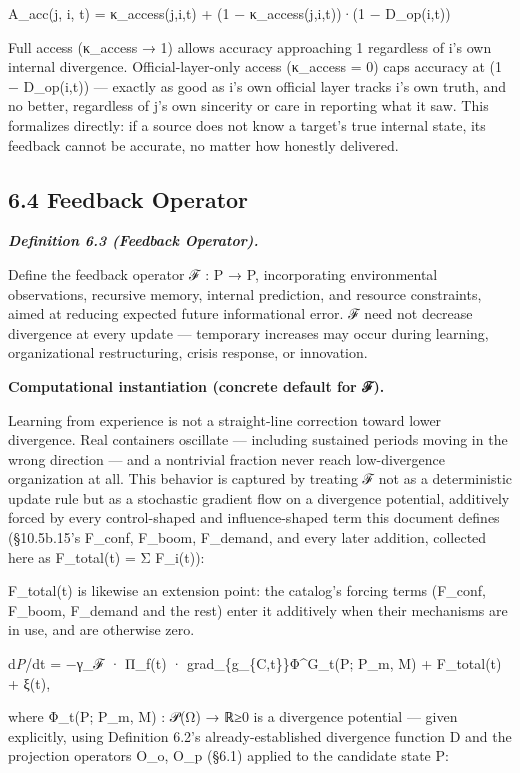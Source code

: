 \documentclass[
]{article}
\begin{document}
A\_acc(j, i, t) = κ\_access(j,i,t) + (1 − κ\_access(j,i,t))·(1 −
D\_op(i,t))

Full access (κ\_access → 1) allows accuracy approaching 1 regardless of
i's own internal divergence. Official-layer-only access (κ\_access = 0)
caps accuracy at (1 − D\_op(i,t)) --- exactly as good as i's own
official layer tracks i's own truth, and no better, regardless of j's
own sincerity or care in reporting what it saw. This formalizes
directly: if a source does not know a target's true internal state, its
feedback cannot be accurate, no matter how honestly delivered.

\hypertarget{feedback-operator}{%
\subsection{6.4 Feedback Operator}\label{feedback-operator}}

\emph{\textbf{Definition 6.3 (Feedback Operator).}}

Define the feedback operator ℱ : P → P, incorporating environmental
observations, recursive memory, internal prediction, and resource
constraints, aimed at reducing expected future informational error. ℱ
need not decrease divergence at every update --- temporary increases may
occur during learning, organizational restructuring, crisis response, or
innovation.

\textbf{Computational instantiation (concrete default for ℱ).}

Learning from experience is not a straight-line correction toward lower
divergence. Real containers oscillate --- including sustained periods
moving in the wrong direction --- and a nontrivial fraction never reach
low-divergence organization at all. This behavior is captured by
treating ℱ not as a deterministic update rule but as a stochastic
gradient flow on a divergence potential, additively forced by every
control-shaped and influence-shaped term this document defines
(§10.5b.15's F\_conf, F\_boom, F\_demand, and every later addition,
collected here as F\_total(t) = Σ F\_i(t)):

F\_total(t) is likewise an extension point: the catalog's forcing terms
(F\_conf, F\_boom, F\_demand and the rest) enter it additively when
their mechanisms are in use, and are otherwise zero.

d\emph{P}/dt = −γ\_ℱ · Π\_f(t) · grad\_\{g\_\{C,t\}\}Φ\^{}G\_t(P; P\_m,
M) + F\_total(t) + ξ(t),

where Φ\_t(P; P\_m, M) : 𝒫(Ω) → ℝ≥0 is a divergence potential --- given
explicitly, using Definition 6.2's already-established divergence
function D and the projection operators O\_o, O\_p (§6.1) applied to the
candidate state P:
\end{document}
